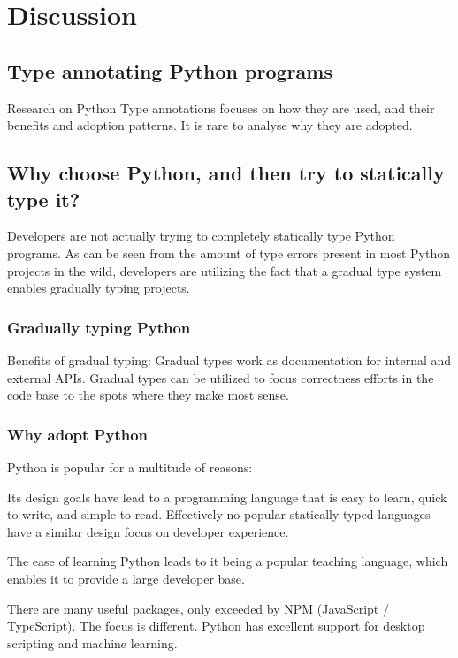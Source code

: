 \chapter{Discussion\label{discussion}}


\section{Type annotating Python programs} 

Research on Python Type annotations focuses on how they are used, and their benefits and adoption patterns. It is rare to analyse why they are adopted.


\section{Why choose Python, and then try to statically type it?}

Developers are not actually trying to completely statically type Python programs. As can be seen from the amount of type errors present in most Python projects in the wild\citetemp, developers are utilizing the fact that a gradual type system enables gradually typing projects.

\subsection{Gradually typing Python}
Benefits of gradual typing: Gradual types work as documentation for internal and external APIs. Gradual types can be utilized to focus correctness efforts in the code base to the spots where they make most sense.

\subsection{Why adopt Python}
Python is popular for a multitude of reasons:

Its design goals have lead to a programming language that is easy to learn, quick to write, and simple to read. Effectively no popular statically typed languages have a similar design focus on developer experience.

The ease of learning Python leads to it being a popular teaching language, which enables it to provide a large developer base.

There are many useful packages, only exceeded by NPM (JavaScript / TypeScript). The focus is different. Python has excellent support for desktop scripting and machine learning.

